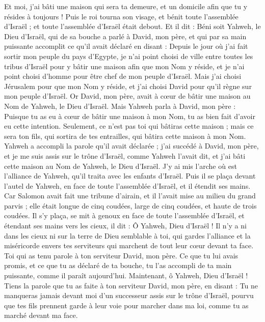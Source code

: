 \begin{multicols}{2}
Et moi, j'ai bâti une maison qui sera ta demeure, et un domicile afin que tu y résides à toujours !
Puis le roi tourna son visage, et bénit toute l'assemblée d'Israël ; et toute l'assemblée d'Israël était debout.
Et il dit : Béni soit Yahweh, le Dieu d'Israël, qui de sa bouche a parlé à David, mon père, et qui par sa main puissante accomplit ce qu'il avait déclaré en disant :
Depuis le jour où j'ai fait sortir mon peuple du pays d'Egypte, je n'ai point choisi de ville entre toutes les tribus d'Israël pour y bâtir une maison afin que mon Nom y réside, et je n'ai point choisi d'homme pour être chef de mon peuple d'Israël.
Mais j'ai choisi Jérusalem pour que mon Nom y réside, et j'ai choisi David pour qu'il règne sur mon peuple d'Israël.
Or David, mon père, avait à cœur de bâtir une maison au Nom de Yahweh, le Dieu d'Israël.
Mais Yahweh parla à David, mon père : Puisque tu as eu à cœur de bâtir une maison à mon Nom, tu as bien fait d'avoir eu cette intention.
Seulement, ce n'est pas toi qui bâtiras cette maison ; mais ce sera ton fils, qui sortira de tes entrailles, qui bâtira cette maison à mon Nom.
Yahweh a accompli la parole qu'il avait déclarée ; j'ai succédé à David, mon père, et je me suis assis sur le trône d'Israël, comme Yahweh l'avait dit, et j'ai bâti cette maison au Nom de Yahweh, le Dieu d'Israël.
J'y ai mis l'arche où est l'alliance de Yahweh, qu'il traita avec les enfants d'Israël.
Puis il se plaça devant l'autel de Yahweh, en face de toute l'assemblée d'Israël, et il étendit ses mains.
Car Salomon avait fait une tribune d'airain, et il l'avait mise au milieu du grand parvis ; elle était longue de cinq coudées, large de cinq coudées, et haute de trois coudées. Il s'y plaça, se mit à genoux en face de toute l'assemblée d'Israël, et étendant ses mains vers les cieux, il dit :
Ô Yahweh, Dieu d'Israël ! Il n'y a ni dans les cieux ni sur la terre de Dieu semblable à toi, qui gardes l'alliance et la miséricorde envers tes serviteurs qui marchent de tout leur cœur devant ta face.
Toi qui as tenu parole à ton serviteur David, mon père. Ce que tu lui avais promis, et ce que tu as déclaré de ta bouche, tu l'as accompli de ta main puissante, comme il paraît aujourd'hui.
Maintenant, ô Yahweh, Dieu d'Israël ! Tiens la parole que tu as faite à ton serviteur David, mon père, en disant : Tu ne manqueras jamais devant moi d'un successeur assis sur le trône d'Israël, pourvu que tes fils prennent garde à leur voie pour marcher dans ma loi, comme tu as marché devant ma face.

\end{multicols}
